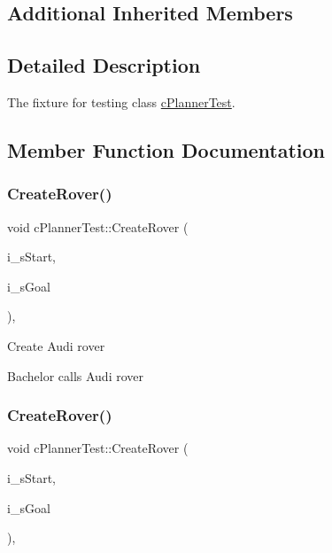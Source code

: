 \subsection*{Additional Inherited Members}


\subsection{Detailed Description}
The fixture for testing class \mbox{\hyperlink{classc_planner_test}{c\+Planner\+Test}}. 

\subsection{Member Function Documentation}
\mbox{\label{classc_planner_test_adc6dedb45d227191f0c87843a182d802}} 
\subsubsection{\texorpdfstring{Create\+Rover()}{CreateRover()}\hspace{0.1cm}{\footnotesize\ttfamily [1/2]}}
{\footnotesize\ttfamily void c\+Planner\+Test\+::\+Create\+Rover (\begin{DoxyParamCaption}\item[{const t\+Location \&}]{i\+\_\+s\+Start,  }\item[{const t\+Location \&}]{i\+\_\+s\+Goal }\end{DoxyParamCaption})\hspace{0.3cm}{\ttfamily [inline]}, {\ttfamily [protected]}}

Create Audi rover

Bachelor calls Audi rover \mbox{\label{classc_planner_test_adc6dedb45d227191f0c87843a182d802}} 
\subsubsection{\texorpdfstring{Create\+Rover()}{CreateRover()}\hspace{0.1cm}{\footnotesize\ttfamily [2/2]}}
{\footnotesize\ttfamily void c\+Planner\+Test\+::\+Create\+Rover (\begin{DoxyParamCaption}\item[{const t\+Location \&}]{i\+\_\+s\+Start,  }\item[{const t\+Location \&}]{i\+\_\+s\+Goal }\end{DoxyParamCaption})\hspace{0.3cm}{\ttfamily [inline]}, {\ttfamily [protected]}}


